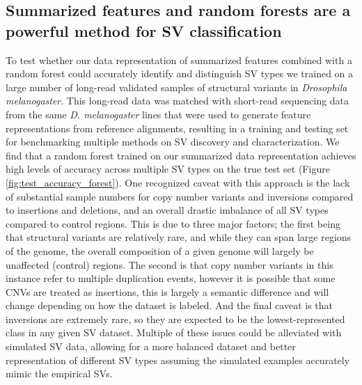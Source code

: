 \subsection{Summarized features and random forests are a powerful method for SV classification}

To test whether our data representation of summarized features combined with a random forest could accurately identify and distinguish SV types we trained on a large number of long-read validated samples of structural variants in \textit{Drosophila melanogaster}. This long-read data was matched with short-read sequencing data from the same \textit{D. melanogaster} lines that were used to generate feature representations from reference alignments, resulting in a training and testing set for benchmarking multiple methods on SV discovery and characterization. We find that a random forest trained on our summarized data representation achieves high levels of accuracy across multiple SV types on the true test set (Figure \ref{fig:test_accuracy_forest}). One recognized caveat with this approach is the lack of substantial sample numbers for copy number variants and inversions compared to insertions and deletions, and an overall drastic imbalance of all SV types compared to control regions. This is due to three major factors; the first being that structural variants are relatively rare, and while they can span large regions of the genome, the overall composition of a given genome will largely be unaffected (control) regions. The second is that copy number variants in this instance refer to multiple duplication events, however it is possible that some CNVs are treated as insertions, this is largely a semantic difference and will change depending on how the dataset is labeled. And the final caveat is that inversions are extremely rare, so they are expected to be the lowest-represented class in any given SV dataset. Multiple of these issues could be alleviated with simulated SV data, allowing for a more balanced dataset and better representation of different SV types assuming the simulated examples accurately mimic the empirical SVs. 

